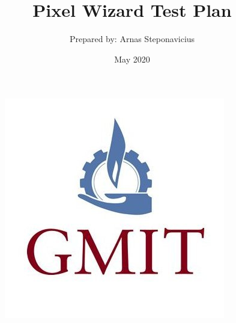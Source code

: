 \documentclass[a4paper, 10pt]{article}
\begin{document}
\begin{figure}
    \centering
    \includegraphics[scale = 0.25]{images/gmit.jpg}
    \label{fig:gmit}
\end{figure}

\title{Pixel Wizard Test Plan}
\author{Prepared by: Arnas Steponavicius }
\date{May 2020}

\maketitle

\tableofcontents
\newpage
\end{document}
